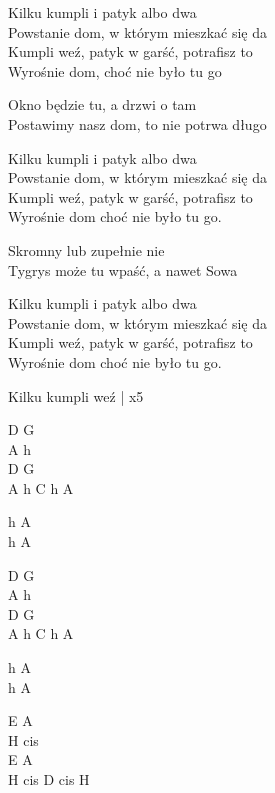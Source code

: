 \begin{text}
    Kilku kumpli i patyk albo dwa\\
    Powstanie dom, w którym mieszkać się da\\
    Kumpli weź, patyk w garść, potrafisz to\\
    Wyrośnie dom, choć nie było tu go

    Okno będzie tu, a drzwi o tam\\
    Postawimy nasz dom, to nie potrwa długo

    Kilku kumpli i patyk albo dwa\\
    Powstanie dom, w którym mieszkać się da\\
    Kumpli weź, patyk w garść, potrafisz to\\
    Wyrośnie dom choć nie było tu go.

    Skromny lub zupełnie nie\\
    Tygrys może tu wpaść, a nawet Sowa

    Kilku kumpli i patyk albo dwa\\
    Powstanie dom, w którym mieszkać się da\\
    Kumpli weź, patyk w garść, potrafisz to\\
    Wyrośnie dom choć nie było tu go.

    Kilku kumpli weź | x5
\end{text}
\begin{chord}
    D G\\
    A h\\
    D G\\
    A h C h A

    h A\\
    h A

    D G\\
    A h\\
    D G\\
    A h C h A

    h A\\
    h A

    E A\\
    H cis\\
    E A\\
    H cis D cis H
\end{chord}
